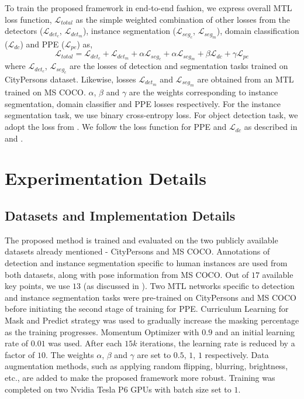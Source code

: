 \documentclass[a4paper,11pt]{article}
\begin{document}
To train the proposed framework in end-to-end fashion, we express overall MTL loss function, $\mathcal{L}_{total}$ as the simple weighted combination of other losses from the detectors ($\mathcal{L}_{det_c}$, $\mathcal{L}_{det_m}$), instance segmentation ($\mathcal{L}_{seg_c}$, $\mathcal{L}_{seg_m}$), domain classification ($\mathcal{L}_{dc}$) and PPE ($\mathcal{L}_{pe}$) as,
\begin{equation}
    \mathcal{L}_{total} = \mathcal{L}_{det_c} + \mathcal{L}_{det_m} +  \alpha\mathcal{L}_{seg_c} + \alpha\mathcal{L}_{seg_m} +  \beta\mathcal{L}_{dc} + \gamma\mathcal{L}_{pe}
\end{equation}
where $\mathcal{L}_{det_c}$, $\mathcal{L}_{seg_c}$ are the losses of detection and segmentation tasks trained on CityPersons dataset. Likewise, losses $\mathcal{L}_{det_m}$ and $\mathcal{L}_{seg_m}$ are obtained from an MTL trained on MS COCO. $\alpha$, $\beta$ and $\gamma$ are the weights corresponding to instance segmentation, domain classifier and PPE losses respectively. For the instance segmentation task, we use binary cross-entropy loss. For object detection task, we adopt the loss from \cite{dasgupta2022spatio}. We follow  the loss function for PPE and $\mathcal{L}_{dc}$ as described in \cite{kishore2019cluenet} and \cite{kocabas2018multiposenet}. 
\section{Experimentation Details}

\subsection{Datasets and Implementation Details}

The proposed method is trained and evaluated on the two publicly available datasets already mentioned - CityPersons and MS COCO. Annotations of detection and instance segmentation specific to human instances are used from both datasets, along with pose information from MS COCO. Out of $17$ available key points, we use $13$ (as discussed in \cite{kishore2019cluenet}). Two MTL networks specific to detection and instance segmentation tasks were pre-trained on CityPersons and MS COCO before initiating the second stage of training for PPE. Curriculum Learning for Mask and Predict strategy was used to gradually increase the masking percentage as the training progresses. Momentum Optimizer with $0.9$ and an initial learning rate of $0.01$ was used. After each $15k$ iterations, the learning rate is reduced by a factor of $10$. The weights $\alpha$, $\beta$ and $\gamma$ are set to $0.5$, $1$, $1$ respectively. Data augmentation methods, such as applying random flipping, blurring, brightness, etc., are added to make the proposed framework more robust. Training was completed on two Nvidia Tesla P$6$ GPUs with batch size set to $1$.  
\end{document}
